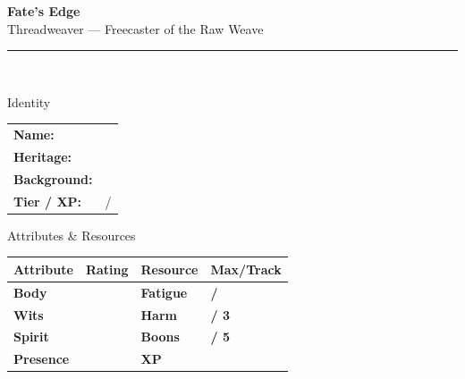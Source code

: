 \documentclass[10pt]{article}
\begin{document}
\begin{center}
    {\Huge\bfseries\sffamily\color{edgered} Fate's Edge}\\[0.2em]
    {\large\sffamily Threadweaver --- Freecaster of the Raw Weave}\\[0.5em]
    \rule{0.5\textwidth}{0.5pt}\\[1em]
\end{center}

\begin{minipage}[t]{0.48\linewidth}
    \begin{charbox}{Identity}
        \begin{tabular}{p{2.5cm} p{5cm}}
            \textbf{Name:} & \underline{\hspace{4cm}} \\
            \textbf{Heritage:} & \underline{\hspace{4cm}} \\
            \textbf{Background:} & \underline{\hspace{4cm}} \\
            \textbf{Tier / XP:} & \underline{\hspace{2cm}} / \underline{\hspace{2cm}} \\
        \end{tabular}
    \end{charbox}
    
    \vspace{0.5em}
    
    \begin{charbox}{Attributes \& Resources}
        \begin{tabular}{>{\bfseries}p{2.5cm} >{\bfseries}p{1.5cm} >{\bfseries}p{2.5cm} >{\bfseries}p{1.5cm}}
            \toprule
            \textbf{Attribute} & \textbf{Rating} & \textbf{Resource} & \textbf{Max/Track} \\
            \midrule
            Body & \underline{\hspace{1.5cm}} & Fatigue & \underline{\hspace{1.5cm}} / \underline{\hspace{1.5cm}} \\
            Wits & \underline{\hspace{1.5cm}} & Harm & \underline{\hspace{1.5cm}} / 3 \\
            Spirit & \underline{\hspace{1.5cm}} & Boons & \underline{\hspace{1.5cm}} / 5 \\
            Presence & \underline{\hspace{1.5cm}} & XP & \underline{\hspace{1.5cm}} \\
            \bottomrule
        \end{tabular}
    \end{charbox}
    

\end{minipage}
\end{document}
